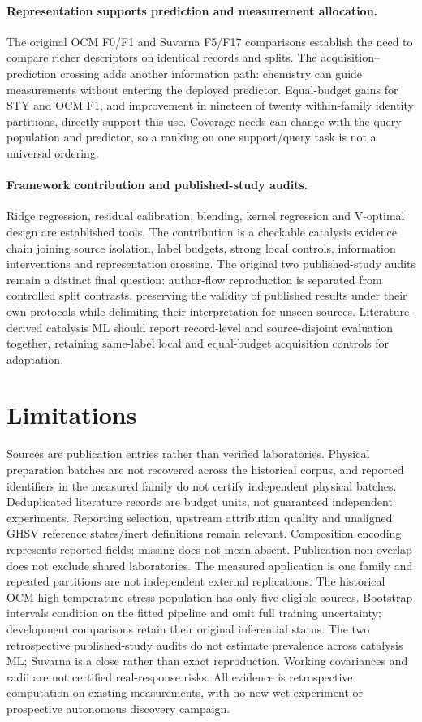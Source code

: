 \documentclass[11pt,a4paper]{article}
\begin{document}
\paragraph{Representation supports prediction and measurement allocation.}
The original OCM F0/F1 and Suvarna F5/F17 comparisons establish the need to compare richer descriptors on identical records and splits.
The acquisition--prediction crossing adds another information path: chemistry can guide measurements without entering the deployed predictor.
Equal-budget gains for STY and OCM F1, and improvement in nineteen of twenty within-family identity partitions, directly support this use.
Coverage needs can change with the query population and predictor, so a ranking on one support/query task is not a universal ordering.

\paragraph{Framework contribution and published-study audits.}
Ridge regression, residual calibration, blending, kernel regression and V-optimal design are established tools.
The contribution is a checkable catalysis evidence chain joining source isolation, label budgets, strong local controls, information interventions and representation crossing.
The original two published-study audits remain a distinct final question: author-flow reproduction is separated from controlled split contrasts,
preserving the validity of published results under their own protocols while delimiting their interpretation for unseen sources.
Literature-derived catalysis ML should report record-level and source-disjoint evaluation together, retaining same-label local and equal-budget acquisition controls for adaptation.

\section{Limitations}
Sources are publication entries rather than verified laboratories. Physical preparation batches are not recovered across the historical corpus, and reported identifiers in the measured family do not certify independent physical batches.
Deduplicated literature records are budget units, not guaranteed independent experiments. Reporting selection, upstream attribution quality and unaligned GHSV reference states/inert definitions remain relevant.
Composition encoding represents reported fields; missing does not mean absent. Publication non-overlap does not exclude shared laboratories.
The measured application is one family and repeated partitions are not independent external replications. The historical OCM high-temperature stress population has only five eligible sources.
Bootstrap intervals condition on the fitted pipeline and omit full training uncertainty; development comparisons retain their original inferential status.
The two retrospective published-study audits do not estimate prevalence across catalysis ML; Suvarna is a close rather than exact reproduction.
Working covariances and radii are not certified real-response risks. All evidence is retrospective computation on existing measurements, with no new wet experiment or prospective autonomous discovery campaign.
\end{document}

